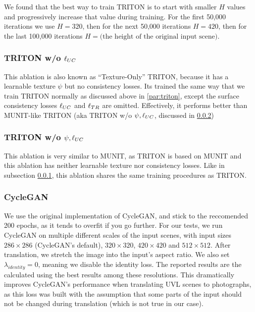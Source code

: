 	We found that the best way to train TRITON is to start with smaller $H$ values and progressively increase that value during training.
	For the first 50,000 iterations we use $H=320$, then for the next 50,000 iterations $H=420$, then for the last 100,000 iterations $H=\text{(the height of the original input scene)}$.

	\subsubsection{TRITON w/o $\ell_{UC}$}
	\label{par:triton_without_luc}
	This ablation is also known as ``Texture-Only'' TRITON, because it has a learnable texture $\psi$ but no consistency losses.
	Its trained the same way that we train TRITON normally as discussed above in \ref{par:triton}, except the surface consistency losses $\ell_{UC}$ and $\ell_{TR}$ are omitted.
	Effectively, it performs better than MUNIT-like TRITON (aka TRITON w/o $\psi, \ell_{UC}$, discussed in \ref{par:munit_triton})

	\subsubsection{TRITON w/o $\psi, \ell_{UC}$}
	\label{par:munit_triton}
	This ablation is very similar to MUNIT, as TRITON is based on MUNIT and this ablation has neither learnable texture nor consistency losses.
	Like in subsection \ref{par:triton_without_luc}, this ablation shares the same training procedures as TRITON.

	\subsubsection{CycleGAN}
	\label{par:cyclegan}
	We use the original implementation of CycleGAN, and stick to the reccomended 200 epochs, as it tends to overfit if you go further. 
	For our tests, we run CycleGAN on multiple different scales of the input scenes, with input sizes $286\times286$ (CycleGAN's default), $320\times320$, $420\times420$ and $512\times512$. 
	After translation, we stretch the image into the input's aspect ratio.
	We also set $\lambda_{identity}=0$, meaning we disable the identity loss.
	The reported results are the calculated using the best results among these resolutions.
	This dramatically improves CycleGAN's performance when translating UVL scenes to photographs, as this loss was built with the assumption that some parts of the input should not be changed during translation (which is not true in our case).
	
